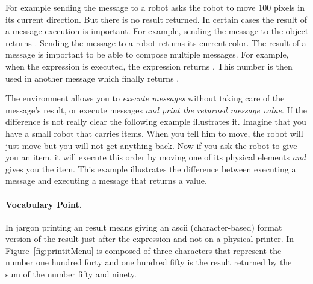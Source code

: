 For example sending the message  to a robot asks the robot to move 100 pixels in its current direction. But there is no result returned. In certain cases the result of a message execution is important. For example, sending the message  to the object  returns . Sending the message  to a robot returns its current color. The result of a message is important to be able to compose multiple messages. For example, when the expression  is executed, the expression  returns . This number is then used in another message  which finally returns .


The \sq environment allows you to \textit{execute messages} without taking care of the message's result, or execute messages \textit{and print the returned message value}. If the difference is not really clear the following example illustrates it. Imagine that you have a small robot that carries items. When you tell him to move, the robot will just move but you will not get anything back. Now if you ask the robot to give you an item, it will execute this order by moving one of its physical elements \textit{and} gives you the item.  This example illustrates the difference between executing a message and executing a message that returns a value. 

\paragraph{Vocabulary Point.} In \sq jargon printing an result means giving an ascii (character-based) format version of the result just after the expression and not on a physical printer. In Figure~\ref{fig:printitMenu}  is composed of three characters that represent the number one hundred forty and one hundred fifty is the result returned by the sum of the number fifty and ninety.

